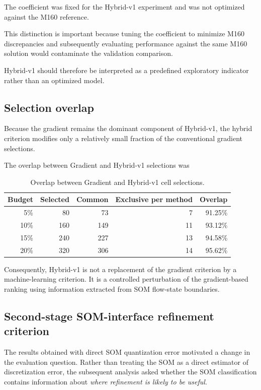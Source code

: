 The coefficient was fixed for the Hybrid-v1 experiment and was not optimized
against the M160 reference.

This distinction is important because tuning the coefficient to minimize
M160 discrepancies and subsequently evaluating performance against the same
M160 solution would contaminate the validation comparison.

Hybrid-v1 should therefore be interpreted as a predefined exploratory
indicator rather than an optimized model.

\subsection{Selection overlap}

Because the gradient remains the dominant component of Hybrid-v1, the hybrid
criterion modifies only a relatively small fraction of the conventional
gradient selections.

The overlap between Gradient and Hybrid-v1 selections was

\begin{table}[htbp]
\centering
\caption{Overlap between Gradient and Hybrid-v1 cell selections.}
\label{tab:gradient_hybrid_overlap}
\begin{tabular}{rrrrr}
\toprule
Budget & Selected & Common & Exclusive per method & Overlap \\
\midrule
5\%  & 80  & 73  & 7  & 91.25\% \\
10\% & 160 & 149 & 11 & 93.12\% \\
15\% & 240 & 227 & 13 & 94.58\% \\
20\% & 320 & 306 & 14 & 95.62\% \\
\bottomrule
\end{tabular}
\end{table}

Consequently, Hybrid-v1 is not a replacement of the gradient criterion by a
machine-learning criterion. It is a controlled perturbation of the
gradient-based ranking using information extracted from SOM flow-state
boundaries.


\subsection{Second-stage SOM-interface refinement criterion}

The results obtained with direct SOM quantization error motivated a change in
the evaluation question. Rather than treating the SOM as a direct estimator
of discretization error, the subsequent analysis asked whether the SOM
classification contains information about \emph{where refinement is likely to
be useful}.

